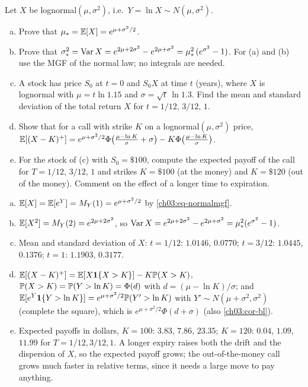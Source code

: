 \begin{paracol}{2}
\begin{exercise}\label{ch03:ex-ps2}
Let $X$ be lognormal$(\mu,\sigma^2)$, i.e.\ $Y=\ln X\sim N(\mu,\sigma^2)$.
\begin{enumerate}[(a)]
  \item Prove that $\mu_*=\mathbb{E}[X]=e^{\mu+\sigma^2/2}$.
  \item Prove that $\sigma_*^2=\operatorname{Var} X=e^{2\mu+2\sigma^2}-e^{2\mu+\sigma^2}=\mu_*^2\,(e^{\sigma^2}-1)$.
      For (a) and (b) use the MGF of the normal law; no integrals are needed.
  \item A stock has price $S_0$ at $t=0$ and $S_0X$ at time $t$ (years), where $X$ is lognormal with $\mu=t\ln1.15$
      and $\sigma=\sqrt t\,\ln1.3$. Find the mean and standard deviation of the total return $X$ for $t=1/12,\,3/12,\,1$.
  \item Show that for a call with strike $K$ on a lognormal$(\mu,\sigma^2)$ price,
      $\mathbb{E}[(X-K)^+]=e^{\mu+\sigma^2/2}\Phi\bigl(\frac{\mu-\ln K}{\sigma}+\sigma\bigr)-K\Phi\bigl(\frac{\mu-\ln K}{\sigma}\bigr)$.
  \item For the stock of (c) with $S_0=\$100$, compute the expected payoff of the call for $T=1/12,\,3/12,\,1$ and
      strikes $K=\$100$ (at the money) and $K=\$120$ (out of the money). Comment on the effect of a longer time to
      expiration.
\end{enumerate}
\end{exercise}
\begin{solution}[ch03:ex-ps2]
\begin{enumerate}[(a)]
  \item $\mathbb{E}[X]=\mathbb{E}[e^Y]=M_Y(1)=e^{\mu+\sigma^2/2}$ by \eqref{ch03:eq-normalmgf}.
  \item $\mathbb{E}[X^2]=M_Y(2)=e^{2\mu+2\sigma^2}$, so $\operatorname{Var} X=e^{2\mu+2\sigma^2}-e^{2\mu+\sigma^2}=\mu_*^2(e^{\sigma^2}-1)$.
  \item Mean and standard deviation of $X$: $t=1/12$: $1.0146$, $0.0770$; $t=3/12$: $1.0445$, $0.1376$; $t=1$: $1.1903$, $0.3177$.
  \item $\mathbb{E}[(X-K)^+]=\mathbb{E}[X\mathbf 1\{X>K\}]-K\mathbb{P}(X>K)$, $\mathbb{P}(X>K)=\mathbb{P}(Y>\ln K)=\Phi(d)$ with $d=(\mu-\ln K)/\sigma$; and
        $\mathbb{E}[e^Y\mathbf 1\{Y>\ln K\}]=e^{\mu+\sigma^2/2}\mathbb{P}(Y'>\ln K)$ with $Y'\sim N(\mu+\sigma^2,\sigma^2)$ (complete the square), which
        is $e^{\mu+\sigma^2/2}\Phi(d+\sigma)$ (also \cref{ch03:cor-bl}).
  \item Expected payoffs in dollars, $K=100$: $3.83$, $7.86$, $23.35$; $K=120$: $0.04$, $1.09$, $11.99$ for $T=1/12,3/12,1$. A longer
        expiry raises both the drift and the dispersion of $X$, so the expected payoff grows; the out-of-the-money call grows
        much faster in relative terms, since it needs a large move to pay anything.
\end{enumerate}
\end{solution}


\end{paracol}

